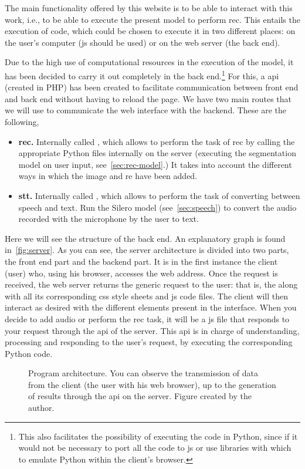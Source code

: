 The main functionality offered by this website is to be able to interact with
this work, i.e., to be able to execute the present model to perform
\gls{rec}. This entails the execution of code, which could be chosen to execute
it in two different places: on the user's computer (\acl{js} should be used) or
on the web server (the back end).

Due to the high use of computational resources in the execution of the model,
it has been decided to carry it out completely in the back end.\footnote{This
  also facilitates the possibility of executing the code in Python, since if it
  would not be necessary to port all the code to \acl{js} or use libraries with
  which to emulate Python within the client's browser.} For this, a \gls{api}
(created in PHP) has been created to facilitate communication between front end
and back end without having to reload the page. We have two main routes that we
will use to communicate the web interface with the backend. These are the
following,
\begin{itemize}
  \item \textbf{\gls{rec}.} Internally called , which
  allows to perform the task of \gls{rec} by calling the appropriate Python
  files internally on the server (executing the segmentation model on user
  input, see\ \vref{sec:rec-model}.) It takes into account the different ways in
  which the image and \gls{re} have been added.
  \item \textbf{\gls{stt}.} Internally called , which allows
  to perform the task of converting between speech and text. Run the Silero
  model (see\ \vref{sec:speech}) to convert the audio recorded with the
  microphone by the user to text.
\end{itemize}

Here we will see the structure of the back end. An explanatory graph is found
in\ \vref{fig:server}. As you can see, the server architecture is divided into
two parts, the front end part and the backend part. It is in the first instance
the client (user) who, using his browser, accesses the web address. Once the
request is received, the web server returns the generic request to the user:
that is, the  along with all its corresponding \acs{css} style
sheets and \acs{js} code files. The client will then interact as desired with
the different elements present in the interface. When you decide to add audio
or perform the \gls{rec} task, it will be a \acs{js} file that responds to your
request through the \gls{api} of the server. This \gls{api} is in charge of
understanding, processing and responding to the user's request, by executing
the corresponding Python code.

\begin{figure}[p]
  \centering
  \scalebox{.8}{}
  \caption[Program architecture]{Program architecture. You can observe the
    transmission of data from the client (the user with his web browser), up to
    the generation of results through the \gls{api} on the server. Figure
    created by the author.}%
  \label{fig:server}
\end{figure}
